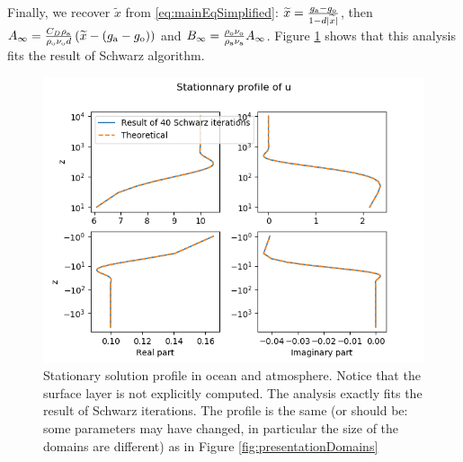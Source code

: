 Finally, we recover $\widetilde{x}$ from \eqref{eq:mainEqSimplified}: $\widetilde{x} = \frac{g_{\rm a} - g_{\rm o}}{1 - d |\widetilde{x}|}$, then $A_\infty = \frac{C_D \rho_{\rm a}}{\rho_{\rm o} \nu_{\rm o} d}\left(\widetilde{x} - (g_{\rm a} - g_{\rm o})\right)$ 
and
$ B_\infty =  \frac{\rho_{\rm o} \nu_{\rm o}}{\rho_{\rm a} \nu_{\rm a}}A_\infty$.
Figure \ref{fig:validation} shows that this analysis fits the result of Schwarz algorithm.
\begin{figure}
    \centering
    \includegraphics[scale=0.55]{validation_stationary_state.png}
    \caption{Stationary solution profile in ocean and atmosphere. Notice that the surface layer is not explicitly computed. The analysis exactly fits the result of Schwarz iterations. The profile is the same {\color{red} (or should be: some parameters may have changed, in particular the size of the domains are different)} as in Figure \ref{fig:presentationDomains}}
    \label{fig:validation}
\end{figure}


